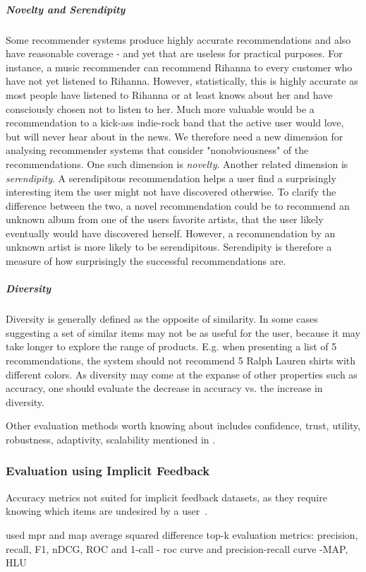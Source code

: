 \subparagraph{Novelty and Serendipity}
Some recommender systems produce highly accurate recommendations and also have reasonable coverage - and yet that are useless for practical purposes. For instance, a music recommender can recommend Rihanna to every customer who have not yet listened to Rihanna. However, statistically, this is highly accurate as most people have listened to Rihanna or at least knows about her and have consciously chosen not to listen to her. Much more valuable would be a recommendation to a kick-ass indie-rock band that the active user would love, but will never hear about in the news. We therefore need a new dimension for analysing recommender systems that consider "nonobviousness" of the recommendations. One such dimension is \emph{novelty}. Another related dimension is \emph{serendipity}. A serendipitous recommendation helps a user find a surprisingly interesting item the user might not have discovered otherwise. To clarify the difference between the two, a novel recommendation could be to recommend an unknown album from one of the users favorite artists, that the user likely eventually would have discovered herself. However, a recommendation by an unknown artist is more likely to be serendipitous. Serendipity is therefore a measure of how surprisingly the successful recommendations are.

\subparagraph{Diversity}
Diversity is generally defined as the opposite of similarity. In some cases suggesting a set of similar items may not be as useful for the user, because it may take longer to explore the range of products. E.g. when presenting a list of 5 recommendations, the system should not recommend 5 Ralph Lauren shirts with different colors. As diversity may come at the expanse of other properties such as accuracy, one should evaluate the decrease in accuracy vs. the increase in diversity.

Other evaluation methods worth knowing about includes confidence, trust, utility, robustness, adaptivity, scalability mentioned in \cite{Herlocker2004, Shani2011}.


\subsubsection{Evaluation using Implicit Feedback}
Accuracy metrics not suited for implicit feedback datasets, as they require
knowing which items are undesired by a user~\cite{Hu2008}.

\cite{deLace2011} used mpr and map
\cite{Nati03weightedlow-rank} average squared difference
\cite{Pan:2013:GGP:2540128.2540516} top-k evaluation metrics: precision, recall, F1, nDCG, ROC and 1-call
\cite{Sindhwani:2010:OMC:1933307.1934641} - roc curve and precision-recall curve
\cite{pan2008} -MAP, HLU


